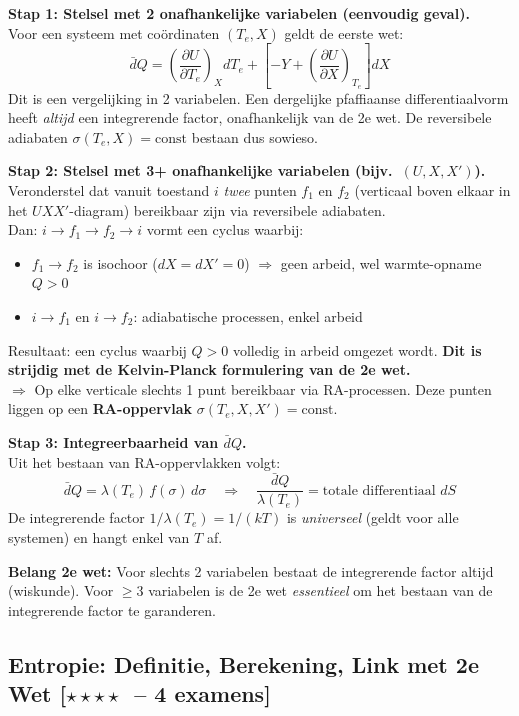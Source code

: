 \documentclass[10pt,a4paper]{article}
\newcommand{\dbar}{\bar{d}}
\newcommand{\pder}[2]{\left(\frac{\partial #1}{\partial #2}\right)}
\begin{document}
\begin{oplossing}
\textbf{Stap 1: Stelsel met 2 onafhankelijke variabelen (eenvoudig geval).}\\
Voor een systeem met coördinaten $(T_e, X)$ geldt de eerste wet:
$$\dbar Q = \pder{U}{T_e}_X dT_e + \left[-Y + \pder{U}{X}_{T_e}\right]dX$$
Dit is een vergelijking in 2 variabelen. Een dergelijke pfaffiaanse differentiaalvorm heeft \emph{altijd} een integrerende factor, onafhankelijk van de 2e wet. De reversibele adiabaten $\sigma(T_e, X) = \text{const}$ bestaan dus sowieso.

\textbf{Stap 2: Stelsel met 3+ onafhankelijke variabelen (bijv.\ $(U, X, X')$).}\\
Veronderstel dat vanuit toestand $i$ \emph{twee} punten $f_1$ en $f_2$ (verticaal boven elkaar in het $UXX'$-diagram) bereikbaar zijn via reversibele adiabaten.\\
Dan: $i \to f_1 \to f_2 \to i$ vormt een cyclus waarbij:
\begin{itemize}
  \item $f_1 \to f_2$ is isochoor ($dX = dX' = 0$) $\Rightarrow$ geen arbeid, wel warmte-opname $Q > 0$
  \item $i \to f_1$ en $i \to f_2$: adiabatische processen, enkel arbeid
\end{itemize}
Resultaat: een cyclus waarbij $Q > 0$ volledig in arbeid omgezet wordt. \textbf{Dit is strijdig met de Kelvin-Planck formulering van de 2e wet.}\\
$\Rightarrow$ Op elke verticale slechts 1 punt bereikbaar via RA-processen. Deze punten liggen op een \textbf{RA-oppervlak} $\sigma(T_e, X, X') = \text{const}$.

\textbf{Stap 3: Integreerbaarheid van $\dbar Q$.}\\
Uit het bestaan van RA-oppervlakken volgt:
$$\dbar Q = \lambda(T_e)\, f(\sigma)\, d\sigma \quad \Rightarrow \quad \frac{\dbar Q}{\lambda(T_e)} = \text{totale differentiaal } dS$$
De integrerende factor $1/\lambda(T_e) = 1/(kT)$ is \emph{universeel} (geldt voor alle systemen) en hangt enkel van $T$ af.

\textbf{Belang 2e wet:} Voor slechts 2 variabelen bestaat de integrerende factor altijd (wiskunde). Voor $\geq 3$ variabelen is de 2e wet \emph{essentieel} om het bestaan van de integrerende factor te garanderen.
\end{oplossing}

\subsection{Entropie: Definitie, Berekening, Link met 2e Wet \textnormal{\color{warningred}[$\star\star\star\star$\ -- 4 examens]}}
\end{document}
